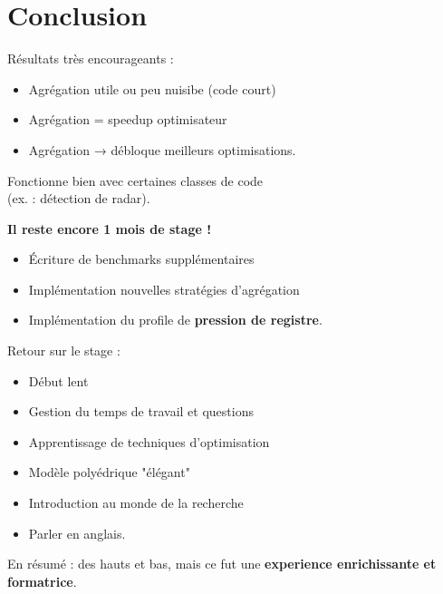 \documentclass[5pt, compress]{beamer}
\makeatletter
\newcommand*{\currentname}{\@currentlabelname}
\makeatother
\begin{document}

\section{Conclusion}
    \begin{frame}{\currentname}
        Résultats très encourageants :
        \vspace{-1em}
        \begin{itemize}
            \item Agrégation utile ou peu nuisibe (code court)
            \item Agrégation = speedup optimisateur
            \item Agrégation → débloque meilleurs optimisations.
        \end{itemize}

        Fonctionne bien avec certaines classes de code\\(ex. : détection de radar).

        \pause

        \textbf{Il reste encore 1 mois de stage !}
        \begin{itemize}
            \item Écriture de benchmarks supplémentaires
            \item Implémentation nouvelles stratégies d'agrégation
            \item Implémentation du profile de \textbf{pression de registre}.
        \end{itemize}
    \end{frame}

    \begin{frame}{\currentname}
        Retour sur le stage :
        \pause
        \begin{itemize}
            \item \alert<+>{Début lent}
            \item \alert<+>{Gestion du temps de travail et questions}
            \item \alert<+>{Apprentissage de techniques d'optimisation}
            \item \alert<+>{Modèle polyédrique "élégant"}
            \item \alert<+>{Introduction au monde de la recherche }
            \item \alert<+>{Parler en anglais.}
        \end{itemize}
        
        \pause

        En résumé : des hauts et bas, mais ce fut une \textbf{experience enrichissante et formatrice}.
    \end{frame}

\end{document}
